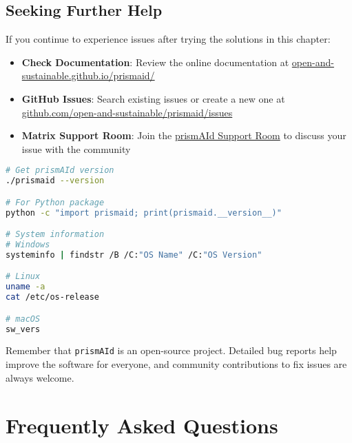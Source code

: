 \section{Seeking Further Help}

If you continue to experience issues after trying the solutions in this chapter:

\begin{itemize}
    \item \textbf{Check Documentation}: Review the online documentation at \href{https://open-and-sustainable.github.io/prismaid/}{open-and-sustainable.github.io/prismaid/}

    \item \textbf{GitHub Issues}: Search existing issues or create a new one at \href{https://github.com/open-and-sustainable/prismaid/issues}{github.com/open-and-sustainable/prismaid/issues}

    \item \textbf{Matrix Support Room}: Join the \href{https://matrix.to/#/#prismAId-support:matrix.org}{prismAId Support Room} to discuss your issue with the community
\end{itemize}

\begin{commandbox}
\begin{lstlisting}[language=Bash]
# Get prismAId version
./prismaid --version

# For Python package
python -c "import prismaid; print(prismaid.__version__)"

# System information
# Windows
systeminfo | findstr /B /C:"OS Name" /C:"OS Version"

# Linux
uname -a
cat /etc/os-release

# macOS
sw_vers
\end{lstlisting}
\end{commandbox}

Remember that \texttt{prismAId} is an open-source project. Detailed bug reports help improve the software for everyone, and community contributions to fix issues are always welcome.

\chapter{Frequently Asked Questions} \label{chap:faq}

